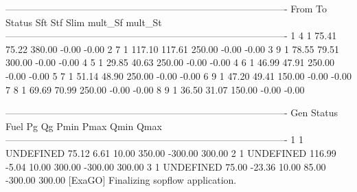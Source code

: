 ----------------------------------------------------------------------------------------
From       To       Status     Sft      Stf     Slim     mult_Sf  mult_St 
----------------------------------------------------------------------------------------
1          4          1       75.41    75.22   380.00    -0.00    -0.00
2          7          1      117.10   117.61   250.00    -0.00    -0.00
3          9          1       78.55    79.51   300.00    -0.00    -0.00
4          5          1       29.85    40.63   250.00    -0.00    -0.00
4          6          1       46.99    47.91   250.00    -0.00    -0.00
5          7          1       51.14    48.90   250.00    -0.00    -0.00
6          9          1       47.20    49.41   150.00    -0.00    -0.00
7          8          1       69.69    70.99   250.00    -0.00    -0.00
8          9          1       36.50    31.07   150.00    -0.00    -0.00

----------------------------------------------------------------------------------------
Gen      Status     Fuel     Pg       Qg       Pmin     Pmax     Qmin     Qmax  
----------------------------------------------------------------------------------------
1          1    UNDEFINED    75.12     6.61    10.00   350.00  -300.00   300.00
2          1    UNDEFINED   116.99    -5.04    10.00   300.00  -300.00   300.00
3          1    UNDEFINED    75.00   -23.36    10.00    85.00  -300.00   300.00
[ExaGO] Finalizing sopflow application.
